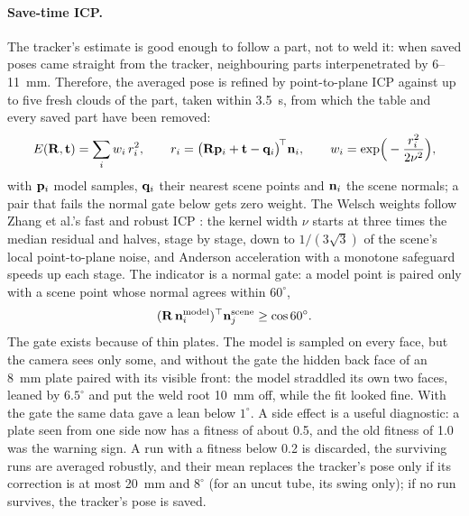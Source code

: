 \paragraph{Save-time ICP.} The tracker's estimate is good enough to follow a part, not to weld it:
when saved poses came straight from the tracker, neighbouring parts interpenetrated by 6--11~mm.
Therefore, the averaged pose is refined by point-to-plane ICP \cite{chen1992p2plane} against up to
five fresh clouds of the part, taken within 3.5~s, from which the table and every saved part have
been removed:
\begin{equation}
E(\mathbf{R},\mathbf{t}) = \sum_i w_i\,r_i^2,\qquad
r_i=\big(\mathbf{R}\mathbf{p}_i+\mathbf{t}-\mathbf{q}_i\big)^{\!\top}\mathbf{n}_i,
\qquad w_i = \exp\!\Big(-\frac{r_i^2}{2\nu^2}\Big),
\label{eq:p2plane}
\end{equation}
with $\mathbf{p}_i$ model samples, $\mathbf{q}_i$ their nearest scene points and $\mathbf{n}_i$ the scene
normals; a pair that fails the normal gate below gets zero weight. The Welsch weights follow Zhang et al.'s fast and robust ICP \cite{zhang2022fricp}: the
kernel width $\nu$ starts at three times the median residual and halves, stage by stage, down to
$1/(3\sqrt3)$ of the scene's local point-to-plane noise, and Anderson acceleration with a
monotone safeguard speeds up each stage. The indicator is a normal gate: a model point is paired
only with a scene point whose normal agrees within $60^\circ$,
\begin{equation}
(\mathbf{R}\,\mathbf{n}^{\mathrm{model}}_i)^{\top}\mathbf{n}^{\mathrm{scene}}_j \ge \cos 60^\circ .
\label{eq:normal_gate}
\end{equation}
The gate exists because of thin plates. The model is sampled on every face, but the camera sees only
some, and without the gate the hidden back face of an 8~mm plate paired with its visible front: the
model straddled its own two faces, leaned by $6.5^\circ$ and put the weld root 10~mm off, while the
fit looked fine. With the gate the same data gave a lean below $1^\circ$. A side effect is a useful
diagnostic: a plate seen from one side now has a fitness of about 0.5, and the old fitness of 1.0
was the warning sign. A run with a fitness below 0.2 is discarded, the surviving runs are averaged
robustly, and their mean replaces the tracker's pose only if its correction is at most 20~mm and
$8^\circ$ (for an uncut tube, its swing only); if no run survives, the tracker's pose is saved.


